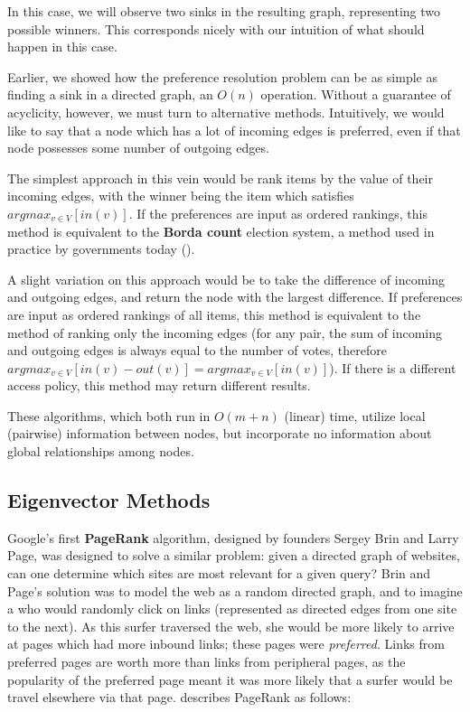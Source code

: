 In this case, we will observe two sinks in the resulting graph, representing two possible winners.
This corresponds nicely with our intuition of what should happen in this case.

\bigskip

Earlier, we showed how the preference resolution problem can be as simple as finding a sink in a directed graph, an $O(n)$ operation.
Without a guarantee of acyclicity, however, we must turn to alternative methods.
Intuitively, we would like to say that a node which has a lot of incoming edges is preferred, even if that node possesses some number of outgoing edges.

The simplest approach in this vein would be rank items by the value of their incoming edges, with the winner being the item which satisfies $argmax_{v \in V}[in(v)]$.
If the preferences are input as ordered rankings, this method is equivalent to the \textbf{Borda count} election system, a method used in practice by governments today (\cite{reilly:2002}).

\bigskip

A slight variation on this approach would be to take the difference of incoming and outgoing edges, and return the node with the largest difference.
If preferences are input as ordered rankings of all items, this method is equivalent to the method of ranking only the incoming edges (for any pair, the sum of incoming and outgoing edges is always equal to the number of votes, therefore $argmax_{v \in V} [in(v) - out(v)] =  argmax_{v \in V}[in(v)]$).
If there is a different access policy, this method may return different results.

These algorithms, which both run in $O(m + n)$ (linear) time, utilize local (pairwise) information between nodes, but incorporate no information about global relationships among nodes.

\subsection{Eigenvector Methods}

Google's first \textbf{PageRank} algorithm, designed by founders Sergey Brin and Larry Page, was designed to solve a similar problem: given a directed graph of websites, can one determine which sites are most relevant for a given query?
Brin and Page's solution was to model the web as a random directed graph, and to imagine a  who would randomly click on links (represented as directed edges from one site to the next).
As this surfer traversed the web, she would be more likely to arrive at pages which had more inbound links; these pages were \textit{preferred}.
Links from preferred pages are worth more than links from peripheral pages, as the popularity of the preferred page meant it was more likely that a surfer would be travel elsewhere via that page.
\cite{brin} describes PageRank as follows:

